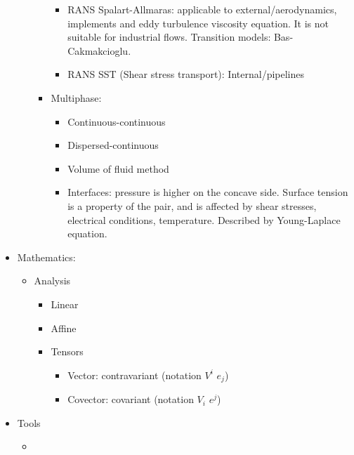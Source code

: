 \begin{itemize}
\begin{itemize}
\begin{itemize}
			\begin{itemize}
				\item RANS Spalart-Allmaras: applicable to external/aerodynamics, implements and eddy turbulence viscosity equation. It is not suitable for industrial flows. Transition models: Bas-Cakmakcioglu.
				\item RANS SST (Shear stress transport): Internal/pipelines
			\end{itemize}
			\item Multiphase:
			\begin{itemize}
				\item Continuous-continuous
				\item Dispersed-continuous
				\item Volume of fluid method
				\item Interfaces: pressure is higher on the concave side. Surface tension is a property of the pair, and is affected by shear stresses, electrical conditions, temperature. Described by Young-Laplace equation.
			\end{itemize}
		\end{itemize}
	\end{itemize}
	\item Mathematics:
	\begin{itemize}
		\item Analysis
		\begin{itemize}
			\item Linear
			\item Affine
			\item Tensors
			\begin{itemize}
				\item Vector: contravariant (notation $V^i$ $e_j$)
				\item Covector: covariant (notation $V_i$ $e^j$)
			\end{itemize}
		\end{itemize}
	\end{itemize}
	\item Tools
	\begin{itemize}
		\item 
	\end{itemize}
\end{itemize}

